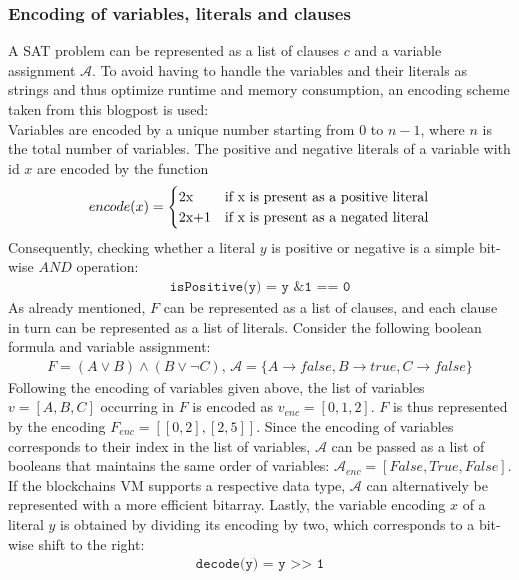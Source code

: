 \subsubsection{Encoding of variables, literals and clauses}
A SAT problem can be represented as a list of clauses $c$ and a variable assignment $\mathcal{A}$. To avoid having to handle the variables and their literals as strings and thus optimize runtime and memory consumption, an encoding scheme taken from this blogpost\cite{sabablog} is used: \\
Variables are encoded by a unique number starting from $0$ to $n-1$, where $n$ is the total number of variables. The positive and negative literals of a variable with id $x$ are encoded by the function
\begin{align*}
encode(x) =
\begin{cases}
  $2x$  & \text{if x is present as a positive literal}\\
  $2x+1$ & \text{if x is present as a negated literal}\\
\end{cases}   
\end{align*}
Consequently, checking whether a literal $y$ is positive or negative is a simple bit-wise $AND$ operation:
\begin{align*}
\texttt{isPositive(y) = y \& 1 == 0}
\end{align*}
As already mentioned, $F$ can be represented as a list of clauses, and each clause in turn can be represented as a list of literals. Consider the following boolean formula and variable assignment:
\begin{align*}
F = (A \vee B) \wedge (B \vee \neg C) \text{, } \mathcal{A} = \{A \rightarrow false, B \rightarrow true, C \rightarrow false\}
\end{align*}
Following the encoding of variables given above, the list of variables $v=[A,B,C]$ occurring in $F$ is encoded as $v_{enc} = [0,1,2]$. $F$ is thus represented by the encoding $F_{enc} = [[0,2],[2,5]]$. Since the encoding of variables corresponds to their index in the list of variables, $\mathcal{A}$ can be passed as a list of booleans that maintains the same order of variables: $\mathcal{A}_{enc} = [False, True, False]$. If the blockchains VM supports a respective data type, $\mathcal{A}$ can alternatively be represented with a more efficient bitarray. Lastly, the variable encoding $x$ of a literal $y$ is obtained by dividing its encoding by two, which corresponds to a bit-wise shift to the right:
\begin{align*}
\texttt{decode(y) = y >> 1}
\end{align*}


